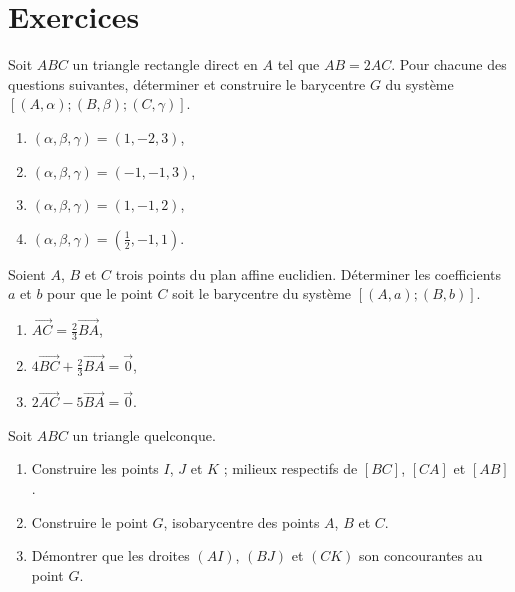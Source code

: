 \section{Exercices}
\begin{exo}
      Soit $ABC$ un triangle rectangle direct en $A$ tel que $AB = 2AC$. 
      Pour chacune des questions suivantes, d\'eterminer et construire le barycentre $G$ du syst\`eme $[(A,\alpha) ; (B,\beta) ; (C,\gamma) ]$.
      \begin{enumerate}
            \item $(\alpha , \beta , \gamma) = (1,-2,3)$,
            \item $(\alpha , \beta , \gamma) = (-1,-1,3)$,
            \item $(\alpha , \beta , \gamma) = (1,-1,2)$,
            \item $(\alpha , \beta , \gamma) = (\frac{1}{2},-1,1)$.
      \end{enumerate}
\end{exo}
%
\begin{exo}
      Soient $A$, $B$ et $C$ trois points du plan affine euclidien.
      D\'eterminer les coefficients $a$ et $b$ pour que le point $C$ soit le barycentre du syst\`eme $[(A,a);(B,b)]$.
      \begin{enumerate}
            \item $\overrightarrow{AC} = \frac{2}{3} \overrightarrow{BA}$,
            \item $4\overrightarrow{BC} + \frac{2}{3} \overrightarrow{BA} = \overrightarrow{0}$,
            \item $2 \overrightarrow{AC} - 5 \overrightarrow{BA} = \overrightarrow{0}$.
      \end{enumerate}
\end{exo}
%
\begin{exo}
      Soit $ABC$ un triangle quelconque.
      \begin{enumerate}
            \item Construire les points $I$, $J$ et $K$ ; milieux respectifs de $[BC]$, $[CA]$ et $[AB]$.
            \item Construire le point $G$, isobarycentre des points $A$, $B$ et $C$.
            \item D\'emontrer que les droites $(AI)$, $(BJ)$ et $(CK)$ son concourantes au point $G$.
      \end{enumerate}
\end{exo}
%
